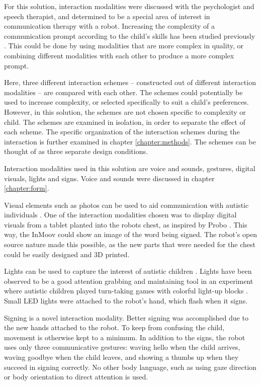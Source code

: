 For this solution, interaction modalities were discussed with the psychologist and speech therapist, and determined to be a special area of interest in communication therapy with a robot. Increasing the complexity of a communication prompt according to the child's skills has been studied previously \cite{ARIA, pop2013social}. This could be done by using modalities that are more complex in quality, or combining different modalities with each other to produce a more complex prompt. 

Here, three different interaction schemes – constructed out of different interaction modalities – are compared with each other. The schemes could potentially be used to increase complexity, or selected specifically to suit a child's preferences. However, in this solution, the schemes are not chosen specific to complexity or child. The schemes are examined in isolation, in order to separate the effect of each scheme. The specific organization of the interaction schemes during the interaction is further examined in chapter \ref{chapter:methods}. The schemes can be thought of as three separate design conditions.

Interaction modalities used in this solution are voice and sounds, gestures, digital visuals, lights and signs. Voice and sounds were discussed in chapter \ref{chapter:form}.

Visual elements such as photos can be used to aid communication with autistic individuals \cite{tetzchner, michaud2003characteristics}. One of the interaction modalities chosen was to display digital visuals from a tablet planted into the robots chest, as inspired by Probo \cite{pop2013social}. This way, the InMoov could show an image of the word being signed. The robot's open source nature made this possible, as the new parts that were needed for the chest could be easily designed and 3D printed.

Lights can be used to capture the interest of autistic children \cite{michaud2003characteristics}. Lights have been observed to be a good attention grabbing and maintaining tool in an experiment where autistic children played turn-taking games with colorful light-up blocks \cite{brok2010engaging}. Small LED lights were attached to the robot's hand, which flash when it signs. 

Signing is a novel interaction modality. Better signing was accomplished due to the new hands attached to the robot. To keep from confusing the child, movement is otherwise kept to a minimum. In addition to the signs, the robot uses only three communicative gestures: waving hello when the child arrives, waving goodbye when the child leaves, and showing a thumbs up when they succeed in signing correctly. No other body language, such as using gaze direction or body orientation to direct attention is used.


